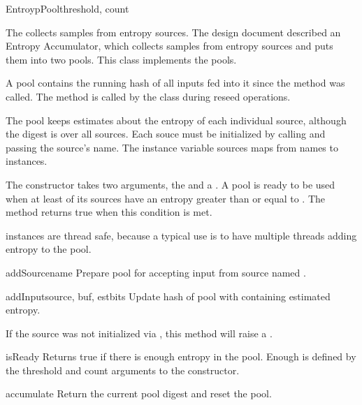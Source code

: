 \documentclass{howto}
\begin{document}
\begin{classdesc}{EntroypPool}{threshold, count}

The  collects samples from entropy sources.  The
design document described an Entropy Accumulator, which collects
samples from entropy sources and puts them into two pools.  This class
implements the pools.

A pool contains the running hash of all inputs fed into it since the
 method was called.  The  method is
called by the  class during reseed operations.

The pool keeps estimates about the entropy of each individual
source, although the digest is over all sources.  Each souce must
be initialized by calling  and passing the source's name.
The instance variable sources maps from names to 
instances.

The constructor takes two arguments, the  and a
.  A pool is ready to be used when at least  of
its sources have an entropy greater than or equal to .
The  method returns true when this condition is met.

 instances are thread safe, because a typical use
is to have multiple threads adding entropy to the pool.

\begin{methoddesc}{addSource}{name}
Prepare pool for accepting input from source named .
\end{methoddesc}

\begin{methoddesc}{addInput}{source, buf, estbits}
Update hash of pool  with  containing
 estimated entropy.

If the source was not initialized via , this method
will raise a .
\end{methoddesc}

\begin{methoddesc}{isReady}{}
Returns true if there is enough entropy in the pool. Enough is defined
by the threshold and count arguments to the constructor.
\end{methoddesc}

\begin{methoddesc}{accumulate}{}
Return the current pool digest and reset the pool.
\end{methoddesc}

\end{classdesc}
\end{document}
